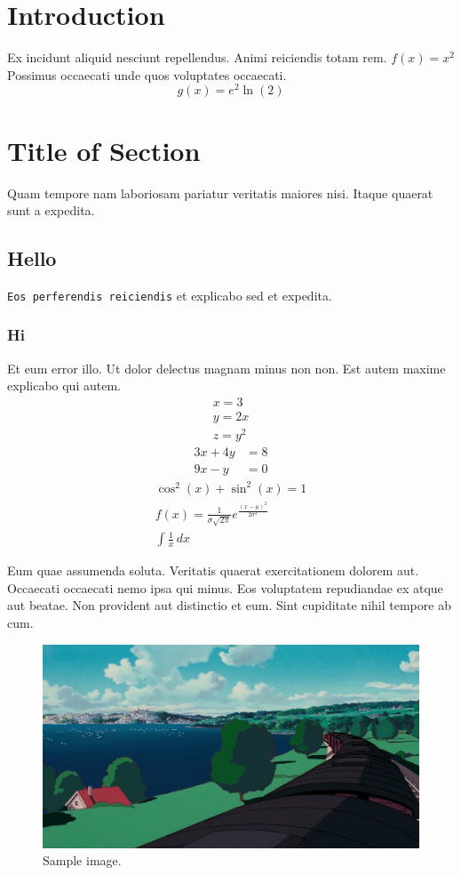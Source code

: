 \documentclass{article}
\begin{document}
\section{Introduction}
Ex incidunt aliquid nesciunt repellendus.
Animi reiciendis totam rem.
$ f(x) = x^2 $
Possimus occaecati unde quos voluptates occaecati.
$$ g(x) = e^2 \ln(2) $$

\section{Title of Section}
Quam tempore nam laboriosam pariatur veritatis maiores nisi.
Itaque quaerat sunt a expedita.
\subsection{Hello}
\texttt{Eos perferendis reiciendis} et explicabo sed et expedita.
\subsubsection{Hi}
Et eum error illo. Ut dolor delectus magnam minus non non. Est autem maxime explicabo qui autem.
\begin{gather*}
    x = 3 \\
    y = 2x \\
    z = y^2
\end{gather*}
\begin{align*}
    3x + 4y &= 8\\
    9x - y &= 0
\end{align*}
\begin{gather*}
    \cos^2(x) + \sin^2(x) = 1\\
    f(x) = \frac{1}{\sigma \sqrt{2\pi}} e^{\frac{(x-\mu)^2}{2\sigma^2}}\\
    \int \frac{1}{x}\,dx
\end{gather*}

Eum quae assumenda soluta. Veritatis quaerat exercitationem dolorem aut. Occaecati occaecati nemo ipsa qui minus. Eos voluptatem repudiandae ex atque aut beatae. Non provident aut distinctio et eum. Sint cupiditate nihil tempore ab cum.

\begin{figure}[h]
    \centering
    \includegraphics[width=\textwidth]{exampleimage.png}
    \caption{Sample image.}
    \label{sampleimage}
\end{figure}
\end{document}
